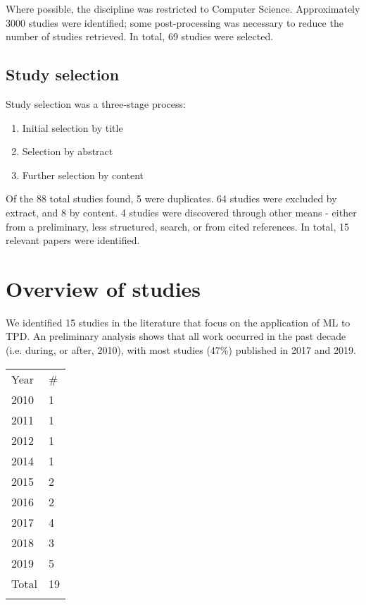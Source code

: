 \documentclass{article}
\begin{document}
Where possible, the discipline was restricted to Computer Science. Approximately 3000 studies were identified; some post-processing was necessary to reduce the number of studies retrieved. In total, 69 studies were selected.


\subsection{Study selection}

Study selection was a three-stage process:

\begin{enumerate}
	\item Initial selection by title
	\item Selection by abstract
	\item Further selection by content
\end{enumerate}

Of the 88 total studies found, 5 were duplicates. 64 studies were excluded by extract, and 8 by content. 4 studies were discovered through other means - either from a preliminary, less structured, search, or from cited references. In total, 15 relevant papers were identified.

\section{Overview of studies}

We identified 15 studies in the literature that focus on the application of ML to TPD. An preliminary analysis shows that all work occurred in the past decade (i.e. during, or after, 2010), with most studies (47\%) published in 2017 and 2019.

\begin{table}[h]
\centering
\begin{tabular}{ll}
\noalign{\smallskip}\hline \noalign{\smallskip}
Year  & \# \\	\noalign{\smallskip}\hline \noalign{\smallskip}
2010  & 1  \\
2011  & 1  \\
2012  & 1  \\
2014 & 1	\\
2015  & 2  \\
2016  & 2  \\
2017  & 4  \\
2018  & 3  \\
2019 & 5  \\ 	\noalign{\smallskip}
Total & 19 \\  \noalign{\smallskip}\hline
\end{tabular}
\end{table}
\end{document}
